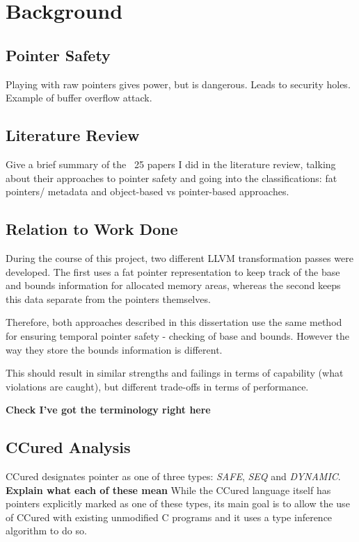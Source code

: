 \chapter{Background}

\section{Pointer Safety}

Playing with raw pointers gives power, but is dangerous. Leads to security holes. Example of buffer overflow attack.

\section{Literature Review}

Give a brief summary of the ~25 papers I did in the literature review, talking about their approaches to pointer safety and going into the classifications: fat pointers/ metadata and object-based vs pointer-based approaches.

\section{Relation to Work Done}

During the course of this project, two different LLVM transformation passes were developed.
The first uses a fat pointer representation to keep track of the base and bounds information for allocated memory areas, whereas the second keeps this data separate from the pointers themselves.

Therefore, both approaches described in this dissertation use the same method for ensuring temporal pointer safety - checking of base and bounds.
However the way they store the bounds information is different.

This should result in similar strengths and failings in terms of capability (what violations are caught), but different trade-offs in terms of performance.


\textbf{Check I've got the terminology right here}

\section{CCured Analysis}

CCured designates pointer as one of three types: \textit{SAFE}, \textit{SEQ} and \textit{DYNAMIC}.
\textbf{Explain what each of these mean}
While the CCured language itself has pointers explicitly marked as one of these types, its main goal is to allow the use of CCured with existing unmodified C programs and it uses a type inference algorithm to do so.

